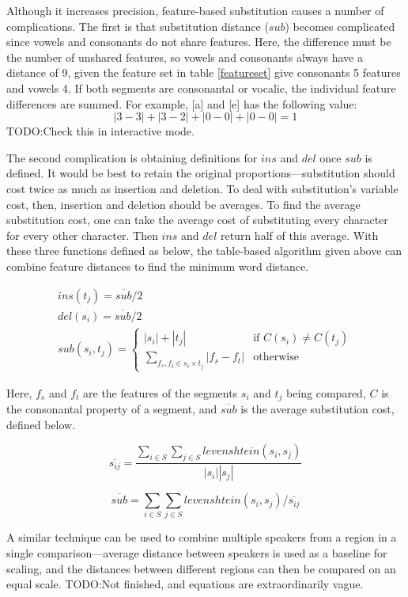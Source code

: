 \documentclass[11pt]{article}
\begin{document}
Although it increases precision, feature-based substitution causes a
number of complications. The first is that substitution distance
($sub$) becomes complicated since vowels and consonants do not share
features.  Here, the difference must be the number of unshared
features, so vowels and consonants always have a distance of 9, given
the feature set in table \ref{featureset} give consonants 5 features
and vowels 4.  If both segments are consonantal or vocalic, the
individual feature differences are summed.  For example, [a] and [e]
has the following value: \[ |3-3| + |3-2| + |0-0| + |0-0| = 1 \]
TODO:Check this in interactive mode.

The second complication is obtaining definitions for $ins$ and $del$
once $sub$ is defined. It would be best to retain the original
proportions---substitution should cost twice as much as insertion and
deletion. To deal with substitution's variable cost, then, insertion and
deletion should be averages. To find the average substitution cost, one can
 take the average cost of substituting every character
for every other character. Then $ins$ and $del$ return half of this
average. With these three functions defined as below, the table-based algorithm
given above can combine feature distances to find the minimum word distance.

\[ \begin{array}{l}
   ins(t_j) = \overline{sub} / 2 \\
   del(s_i) = \overline{sub} / 2 \\
   sub(s_i,t_j) = \left\{
     \begin{array}{ll}
       |s_i|+|t_j| & \textrm{if $C(s_i) \ne C(t_j)$} \\
       \sum_{f_s,f_t \in s_i \times t_j} |f_s - f_t| & \textrm{otherwise}
     \end{array} \right.

   \end{array}
\]

Here, $f_s$ and $f_t$ are the features of the segments $s_i$ and $t_j$
being compared, $C$ is the consonantal property of a segment, and
$\overline{sub}$ is the average substitution cost, defined below.

\[ \overline{s_{ij}} = \frac{\sum_{i \in S}\sum_{j \in S}{levenshtein(s_i,s_j)}}{|s_i||s_j|}\]

\[ \overline{sub} = \sum_{i \in S}\sum_{j \in S}levenshtein(s_i,s_j) / \overline{s_{ij}} \]

A similar technique can be used to combine multiple speakers from a
region in a single comparison---average distance between speakers is
used as a baseline for scaling, and the distances between different
regions can then be compared on an equal scale.
TODO:Not finished, and equations are extraordinarily vague.
\end{document}
